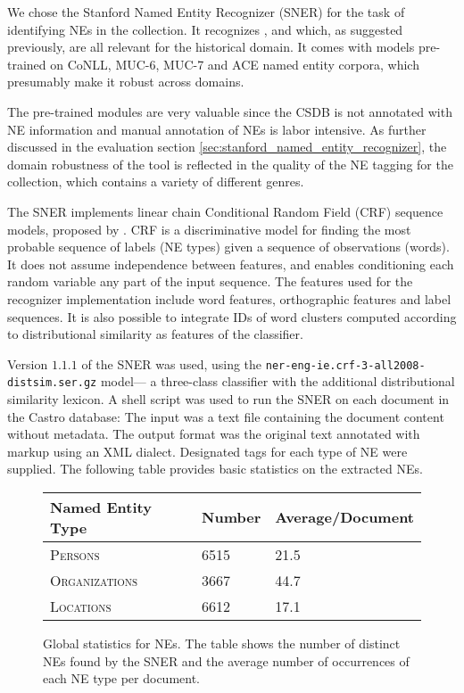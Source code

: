 We chose the Stanford Named Entity Recognizer (SNER) \cite{sner} for the task of identifying NEs in the collection. It recognizes ,  and  which, as suggested previously, are all relevant for the historical domain. It comes with models pre-trained on CoNLL, MUC-6, MUC-7 and ACE named entity corpora, which presumably make it robust across domains.

The pre-trained modules are very valuable since the CSDB is not annotated with NE information and manual annotation of NEs is labor intensive. As further discussed in the evaluation section \ref{sec:stanford_named_entity_recognizer}, the domain robustness of the tool is reflected in the quality of the NE tagging for the collection, which contains a variety of different genres. 

The SNER implements linear chain Conditional Random Field (CRF) sequence models, proposed by \cite{lafferty2001conditional}.
CRF is a discriminative model for finding the most probable sequence of labels (NE types) given a sequence of observations (words). 
It does not assume independence between features, and enables conditioning each random variable any part of the input sequence. The features used for the recognizer implementation include word features, orthographic features and label sequences. It is also possible to integrate IDs of word clusters computed according to distributional similarity as features of the classifier.

Version $1.1.1$ of the SNER was used, using the
\texttt{ner-eng-ie.crf-3-all2008-distsim.ser.gz} model--- a three-class classifier with the additional
distributional similarity lexicon. A shell script was used to run the SNER on each document in the Castro database: The input was a text file containing the document content without metadata. The output format was the original text annotated with markup using an XML dialect. Designated tags for each type of NE were supplied. The following table provides basic statistics on the extracted NEs.

\begin{figure}[ht]
\centering
\caption{Global statistics for NEs. The table shows the number of distinct NEs found by the SNER and the average number of occurrences of each NE type per document.}
\begin{tabular}{l|ll}
  Named Entity Type      & Number & Average/Document\\
  \hline
  \textsc{Persons}       & 6515   & 21.5\\
  \textsc{Organizations} & 3667   & 44.7\\
  \textsc{Locations}     & 6612   & 17.1\\
\end{tabular}
\label{fig:ne_statistics}
\end{figure}
